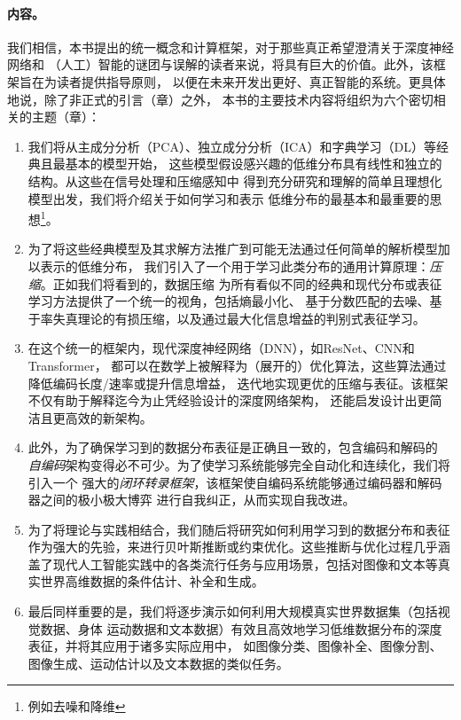 \documentclass[../../book-main_zh.tex]{subfiles}
\begin{document}
\paragraph{内容。}
我们相信，本书提出的统一概念和计算框架，对于那些真正希望澄清关于深度神经网络和
（人工）智能的谜团与误解的读者来说，将具有巨大的价值。此外，该框架旨在为读者提供指导原则，
以便在未来开发出更好、真正智能的系统。更具体地说，除了非正式的引言（章）之外，
本书的主要技术内容将组织为六个密切相关的主题（章）：
\begin{enumerate}
    \item 我们将从主成分分析（PCA）、独立成分分析（ICA）和字典学习（DL）等经典且最基本的模型开始，
        这些模型假设感兴趣的低维分布具有线性和独立的结构。从这些在信号处理和压缩感知中
        得到充分研究和理解的简单且理想化模型出发，我们将介绍关于如何学习和表示
        低维分布的最基本和最重要的思想\footnote{例如去噪和降维}。

    \item 为了将这些经典模型及其求解方法推广到可能无法通过任何简单的解析模型加以表示的低维分布，
        我们引入了一个用于学习此类分布的通用计算原理：{\em 压缩}。正如我们将看到的，数据压缩
        为所有看似不同的经典和现代分布或表征学习方法提供了一个统一的视角，包括熵最小化、
        基于分数匹配的去噪、基于率失真理论的有损压缩，以及通过最大化信息增益的判别式表征学习。

    \item 在这个统一的框架内，现代深度神经网络（DNN），如ResNet、CNN和Transformer，
        都可以在数学上被解释为（展开的）优化算法，这些算法通过降低编码长度/速率或提升信息增益，
        迭代地实现更优的压缩与表征。该框架不仅有助于解释迄今为止凭经验设计的深度网络架构，
        还能启发设计出更简洁且更高效的新架构。

    \item 此外，为了确保学习到的数据分布表征是正确且一致的，包含编码和解码的
        {\em 自编码}架构变得必不可少。为了使学习系统能够完全自动化和连续化，我们将引入一个
        强大的{\em 闭环转录框架}，该框架使自编码系统能够通过编码器和解码器之间的极小极大博弈
        进行自我纠正，从而实现自我改进。

    \item 为了将理论与实践相结合，我们随后将研究如何利用学习到的数据分布和表征
        作为强大的先验，来进行贝叶斯推断或约束优化。这些推断与优化过程几乎涵盖了现代人工智能实践中的各类流行任务与应用场景，包括对图像和文本等真实世界高维数据的条件估计、补全和生成。

    \item 最后同样重要的是，我们将逐步演示如何利用大规模真实世界数据集（包括视觉数据、身体
        运动数据和文本数据）有效且高效地学习低维数据分布的深度表征，并将其应用于诸多实际应用中，
        如图像分类、图像补全、图像分割、图像生成、运动估计以及文本数据的类似任务。
\end{enumerate}
\end{document}
